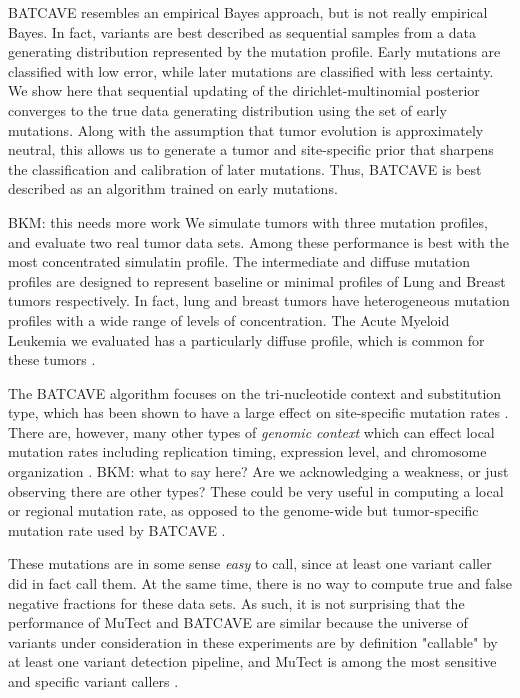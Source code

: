 \documentclass[a4,center,fleqn]{NAR}
\newcommand{\bkmcomment}[1]{{\color{blue}BKM: #1}}
\newcommand{\batcave}{BATCAVE }
\begin{document}
\batcave resembles an empirical Bayes approach, but is not really empirical Bayes.
In fact, variants are best described as sequential samples from a data generating distribution represented by the mutation profile.
Early mutations are classified with low error, while later mutations are classified with less certainty.
We show here that sequential updating of the dirichlet-multinomial posterior converges to the true data generating distribution using the set of early mutations.
Along with the assumption that tumor evolution is approximately neutral, this allows us to generate a tumor and site-specific prior that sharpens the classification and calibration of later mutations.
Thus, \batcave is best described as an algorithm trained on early mutations.

\bkmcomment{this needs more work}
We simulate tumors with three mutation profiles, and evaluate two real tumor data sets.
Among these performance is best with the most concentrated simulatin profile.
The intermediate and diffuse mutation profiles are designed to represent baseline or minimal profiles of Lung and Breast tumors respectively.
In fact, lung and breast tumors have heterogeneous mutation profiles with a wide range of levels of concentration.
The Acute Myeloid Leukemia we evaluated has a particularly diffuse profile, which is common for these tumors \cite{Alexandrov2019}.

The \batcave algorithm focuses on the tri-nucleotide context and substitution type, which has been shown to have a large effect on site-specific mutation rates \cite{Martincorena2015,Hollstein2017}.
There are, however, many other types of \textit{genomic context} which can effect local mutation rates including replication timing, expression level, and chromosome organization \cite{Buisson2019,Schuster-Bockler2012,Pleasance2010}.
\bkmcomment{what to say here? Are we acknowledging a weakness, or just observing there are other types?}
These could be very useful in computing a local or regional mutation rate, as opposed to the genome-wide but tumor-specific mutation rate used by \batcave.

These mutations are in some sense \textit{easy} to call, since at least one variant caller did in fact call them.
At the same time, there is no way to compute true and false negative fractions for these data sets.
As such, it is not surprising that the performance of MuTect and \batcave are similar because the universe of variants under consideration in these experiments are by definition "callable" by at least one variant detection pipeline, and MuTect is among the most sensitive and specific variant callers \cite{Griffith2015,Cibulskis2013}.
\end{document}

